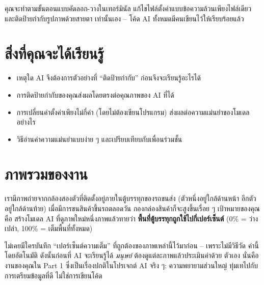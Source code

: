 \documentclass[11pt]{article}
\title{}
\date{}
\begin{document}
\thispagestyle{fancy}

\nocodebadge

คุณจะทำตามขั้นตอนแบบคัดลอก-วางในเทอร์มินัล แก้ไขไฟล์ตั้งค่าแบบข้อความล้วนเพียงไฟล์เดียว
และติดป้ายกำกับรูปภาพด้วยสายตา เท่านั้นเอง -- โค้ด AI ทั้งหมดมีคนเขียนไว้ให้เรียบร้อยแล้ว

\section*{สิ่งที่คุณจะได้เรียนรู้}
\begin{itemize}
  \item เหตุใด AI จึงต้องการตัวอย่างที่ ``ติดป้ายกำกับ'' ก่อนจึงจะเรียนรู้อะไรได้
  \item การติดป้ายกำกับของคุณส่งผลโดยตรงต่อคุณภาพของ AI ที่ได้
  \item การเปลี่ยนค่าตั้งค่าเพียงไม่กี่ค่า (โดยไม่ต้องเขียนโปรแกรม) ส่งผลต่อความแม่นยำของโมเดลอย่างไร
  \item วิธีอ่านค่าความแม่นยำแบบง่าย ๆ และเปรียบเทียบกับเพื่อนร่วมชั้น
\end{itemize}

\section*{ภาพรวมของงาน}
เรามีภาพถ่ายจากกล้องสองตัวที่ติดตั้งอยู่ภายในตู้บรรทุกของรถขนส่ง (ตัวหนึ่งอยู่ใกล้ด้านหน้า
อีกตัวอยู่ใกล้ด้านท้าย) เมื่อมีการขนสินค้าขึ้นรถตลอดวัน กองกล่องสินค้าก็จะสูงขึ้นเรื่อย ๆ
เป้าหมายของคุณคือ สร้างโมเดล AI ที่ดูภาพใหม่หนึ่งภาพแล้วทายว่า \textbf{พื้นที่ตู้บรรทุกถูกใช้ไปกี่เปอร์เซ็นต์}
(0\% = ว่างเปล่า, 100\% = เต็มพื้นที่ทั้งหมด)

\begin{notebox}
ไม่เคยมีใครบันทึก ``เปอร์เซ็นต์ความเต็ม'' ที่ถูกต้องของภาพเหล่านี้ไว้มาก่อน -- เพราะไม่มีวิธีวัด
ค่านี้โดยอัตโนมัติ ดังนั้นก่อนที่ AI จะเรียนรู้ได้ \emph{มนุษย์} ต้องดูแต่ละภาพแล้วประเมินค่าด้วย
ตัวเอง นั่นคืองานของคุณใน Part 1 ซึ่งเป็นเรื่องปกติในโปรเจกต์ AI จริง ๆ: ความพยายามส่วนใหญ่
ทุ่มเทไปกับการเตรียมข้อมูลที่ดี ไม่ใช่การเขียนโค้ด
\end{notebox}
\end{document}
